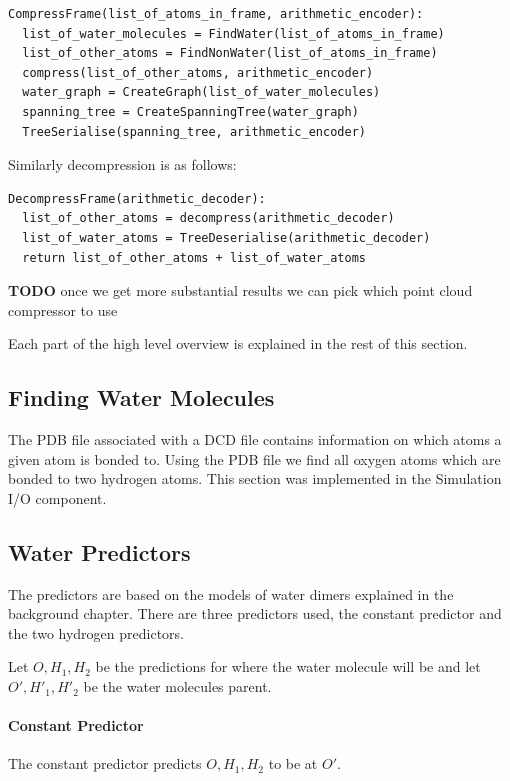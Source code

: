 \documentclass{report}
\newcommand{\todo}{\textbf{TODO} }
\begin{document}
\begin{verbatim}
CompressFrame(list_of_atoms_in_frame, arithmetic_encoder):
  list_of_water_molecules = FindWater(list_of_atoms_in_frame)
  list_of_other_atoms = FindNonWater(list_of_atoms_in_frame)
  compress(list_of_other_atoms, arithmetic_encoder)
  water_graph = CreateGraph(list_of_water_molecules)
  spanning_tree = CreateSpanningTree(water_graph)
  TreeSerialise(spanning_tree, arithmetic_encoder)
\end{verbatim}

\noindent Similarly decompression is as follows:

\begin{verbatim}
DecompressFrame(arithmetic_decoder):
  list_of_other_atoms = decompress(arithmetic_decoder)
  list_of_water_atoms = TreeDeserialise(arithmetic_decoder)
  return list_of_other_atoms + list_of_water_atoms
\end{verbatim}

\todo once we get more substantial results we can pick which point cloud compressor to use

Each part of the high level overview is explained in the rest of this section.


\subsection{Finding Water Molecules}

The PDB file associated with a DCD file contains information on which atoms a
given atom is bonded to. Using the PDB file we find all oxygen atoms which are
bonded to two hydrogen atoms. This section was implemented in the Simulation
I/O component.


\subsection{Water Predictors}

The predictors are based on the models of water dimers explained in the
background chapter. There are three predictors used, the constant predictor
and the two hydrogen predictors.

Let $O, H_1, H_2$ be the predictions for where the water molecule will be and
let $O', H'_1, H'_2$ be the water molecules parent.

\paragraph{Constant Predictor}
The constant predictor predicts $O, H_1, H_2$ to be at $O'$.
\end{document}
